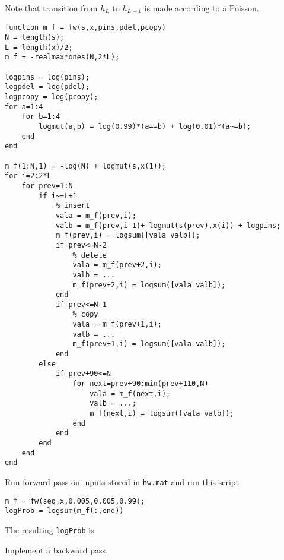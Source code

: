 \documentclass{article}
\begin{document}
Note that transition from $h_{L}$ to $h_{L+1}$ is made according to a Poisson.
\begin{verbatim}
function m_f = fw(s,x,pins,pdel,pcopy)
N = length(s);
L = length(x)/2;
m_f = -realmax*ones(N,2*L);

logpins = log(pins);
logpdel = log(pdel);
logpcopy = log(pcopy);
for a=1:4
    for b=1:4
        logmut(a,b) = log(0.99)*(a==b) + log(0.01)*(a~=b);
    end
end

m_f(1:N,1) = -log(N) + logmut(s,x(1));
for i=2:2*L
    for prev=1:N
        if i~=L+1
            % insert
            vala = m_f(prev,i);
            valb = m_f(prev,i-1)+ logmut(s(prev),x(i)) + logpins;
            m_f(prev,i) = logsum([vala valb]);
            if prev<=N-2
                % delete
                vala = m_f(prev+2,i);
                valb = ...
                m_f(prev+2,i) = logsum([vala valb]);
            end
            if prev<=N-1
                % copy
                vala = m_f(prev+1,i);
                valb = ...
                m_f(prev+1,i) = logsum([vala valb]);
            end
        else
            if prev+90<=N
                for next=prev+90:min(prev+110,N)
                    vala = m_f(next,i);
                    valb = ...;
                    m_f(next,i) = logsum([vala valb]);
                end
            end
        end
    end
end
\end{verbatim}
Run forward pass on inputs stored in {\tt hw\theHW.mat} and run this script
\begin{verbatim}
m_f = fw(seq,x,0.005,0.005,0.99);
logProb = logsum(m_f(:,end))
\end{verbatim}
The resulting {\tt logProb} is \answer

\newproblem{3pt} Implement a backward pass.
\end{document}
